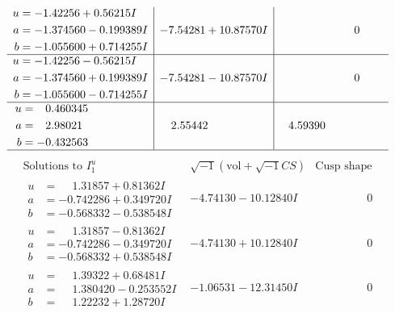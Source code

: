 \documentclass[1p]{elsarticle_modified}
\theoremstyle{definition}
\newcommand{\I}{\sqrt{-1}}
\begin{document}
$$\begin{array}{c|c|c}
\begin{aligned}
u &= -1.42256 + 0.56215 I \\
a &= -1.374560 - 0.199389 I \\
b &= -1.055600 + 0.714255 I\end{aligned}
 & -7.54281 + 10.87570 I & \phantom{-0.000000 } 0 \\ \hline\begin{aligned}
u &= -1.42256 - 0.56215 I \\
a &= -1.374560 + 0.199389 I \\
b &= -1.055600 - 0.714255 I\end{aligned}
 & -7.54281 - 10.87570 I & \phantom{-0.000000 } 0 \\ \hline\begin{aligned}
u &= \phantom{-}0.460345\phantom{ +0.000000I} \\
a &= \phantom{-}2.98021\phantom{ +0.000000I} \\
b &= -0.432563\phantom{ +0.000000I}\end{aligned}
 & \phantom{-}2.55442\phantom{ +0.000000I} & \phantom{-}4.59390\phantom{ +0.000000I}\\
 \hline 
 \end{array}$$\newpage$$\begin{array}{c|c|c}  
\text{Solutions to }I^u_{1}& \I (\text{vol} + \sqrt{-1}CS) & \text{Cusp shape}\\
 \hline 
\begin{aligned}
u &= \phantom{-}1.31857 + 0.81362 I \\
a &= -0.742286 + 0.349720 I \\
b &= -0.568332 - 0.538548 I\end{aligned}
 & -4.74130 - 10.12840 I & \phantom{-0.000000 } 0 \\ \hline\begin{aligned}
u &= \phantom{-}1.31857 - 0.81362 I \\
a &= -0.742286 - 0.349720 I \\
b &= -0.568332 + 0.538548 I\end{aligned}
 & -4.74130 + 10.12840 I & \phantom{-0.000000 } 0 \\ \hline\begin{aligned}
u &= \phantom{-}1.39322 + 0.68481 I \\
a &= \phantom{-}1.380420 - 0.253552 I \\
b &= \phantom{-}1.22232 + 1.28720 I\end{aligned}
 & -1.06531 - 12.31450 I & \phantom{-0.000000 } 0 \\ \hline\begin{aligned}

\end{aligned}
\end{array}$$
\end{document}
